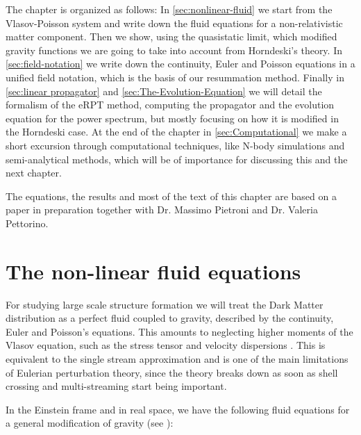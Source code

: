 The chapter is organized as follows:
In \cref{sec:nonlinear-fluid} we start from the Vlasov-Poisson
system and write down the fluid equations for a non-relativistic matter component.
Then we show, using the quasistatic limit, which modified gravity functions we are going to 
take into account from Horndeski's theory.
In \cref{sec:field-notation} we write down the continuity, Euler and Poisson equations in a unified
field notation, which is the basis of our resummation method.
Finally in \cref{sec:linear propagator} and \cref{sec:The-Evolution-Equation} we will detail
the formalism of the eRPT method, computing the propagator 
and the evolution equation for the power spectrum, but mostly focusing on how it is modified in the Horndeski case. 
At the end of the chapter in \cref{sec:Computational} we make a short excursion through
computational techniques, like N-body simulations and semi-analytical methods, which
will be of importance for discussing this and the next chapter.

The equations, the results and most of the text of this chapter are based on a paper in preparation together with
Dr. Massimo Pietroni and Dr. Valeria Pettorino.


\section{The non-linear fluid equations \label{sec:nonlinear-fluid}}



For studying large scale structure formation we will treat the Dark
Matter distribution as a perfect fluid coupled to gravity, described
by the continuity, Euler and Poisson's equations. This amounts to
neglecting higher moments of the Vlasov equation, such as the stress
tensor and velocity dispersions \cite{bernardeau_large-scale_2001}.
This is equivalent to the single stream approximation and is one of
the main limitations of Eulerian perturbation theory, since the theory
breaks down as soon as shell crossing and multi-streaming start being
important.

In the Einstein frame and in real space, we have the following fluid equations for a
general modification of gravity (see \cite{pietroni_flowing_2008}):

